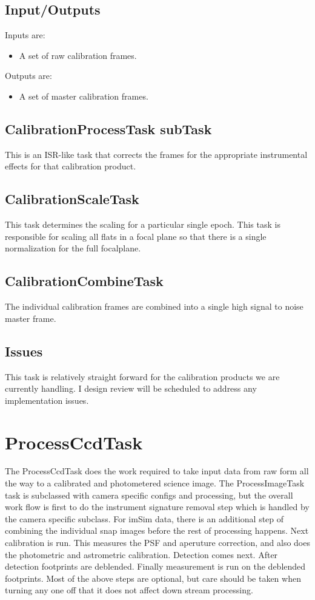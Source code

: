 \documentclass[12pt]{article}
\begin{document}
\subsection{Input/Outputs}
Inputs are:
\begin{itemize}
\item A set of raw calibration frames.
\end{itemize}
Outputs are:
\begin{itemize}
\item A set of master calibration frames.
\end{itemize}

\subsection{CalibrationProcessTask subTask}
This is an ISR-like task that corrects the frames for the appropriate instrumental effects for that calibration
product.
\subsection{CalibrationScaleTask}
This task determines the scaling for a particular single epoch.  This task is responsible for
scaling all flats in a focal plane so that there is a single normalization for the full focalplane.
\subsection{CalibrationCombineTask}
The individual calibration frames are combined into a single high signal to noise master frame.

\subsection{Issues}
This task is relatively straight forward for the calibration products we are currently handling.  I design review will be scheduled
to address any implementation issues.



\clearpage 
\section{ProcessCcdTask\label{processccdsec}} 
The ProcessCcdTask does the work required to take input data from raw form all the way to a calibrated and
photometered science image.  The ProcessImageTask task is subclassed with camera specific configs and processing, but the overall 
work flow is first to do the instrument signature removal step which is handled by the camera specific subclass.  For imSim
data, there is an additional step of combining the individual snap images before the rest of processing happens. Next calibration
is run.  This measures the PSF and aperuture correction, and also does the photometric and astrometric calibration.  
Detection comes next.  After detection footprints are deblended.
Finally measurement is run on the deblended footprints.  Most of the above steps are optional, but care should be taken
when turning any one off that it does not affect down stream processing.
\end{document}
